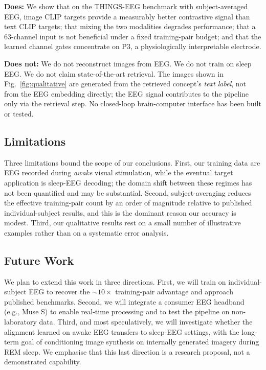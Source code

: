 \documentclass[conference]{IEEEtran}
\begin{document}
\textbf{Does:} We show that on the
THINGS-EEG benchmark with subject-averaged
EEG, image CLIP targets provide a
measurably better contrastive signal than
text CLIP targets; that mixing the two
modalities degrades performance; that a
63-channel input is not beneficial under
a fixed training-pair budget; and that the
learned channel gates concentrate on P3,
a physiologically interpretable electrode.

\textbf{Does not:} We do not reconstruct
images from EEG. We do not train on sleep
EEG. We do not claim state-of-the-art
retrieval. The images shown in
Fig.~\ref{fig:qualitative} are generated
from the retrieved concept's \emph{text
label}, not from the EEG embedding directly;
the EEG signal contributes to the pipeline
only via the retrieval step. No closed-loop
brain-computer interface has been built or
tested.

\subsection{Limitations}

Three limitations bound the scope of our
conclusions. First, our training data are
EEG recorded during \emph{awake} visual
stimulation, while the eventual target
application is sleep-EEG decoding; the
domain shift between these regimes has not
been quantified and may be substantial.
Second, subject-averaging reduces the
effective training-pair count by an order
of magnitude relative to published
individual-subject results, and this is
the dominant reason our accuracy is
modest. Third, our qualitative results
rest on a small number of illustrative
examples rather than on a systematic
error analysis.

\subsection{Future Work}

We plan to extend this work in three
directions. First, we will train on
individual-subject EEG to recover the
$\sim 10\times$ training-pair advantage
and approach published benchmarks.
Second, we will integrate a consumer
EEG headband (e.g., Muse S) to enable
real-time processing and to test the
pipeline on non-laboratory data. Third,
and most speculatively, we will investigate
whether the alignment learned on awake
EEG transfers to sleep-EEG settings,
with the long-term goal of conditioning
image synthesis on internally generated
imagery during REM sleep. We emphasise
that this last direction is a research
proposal, not a demonstrated capability.
\end{document}
